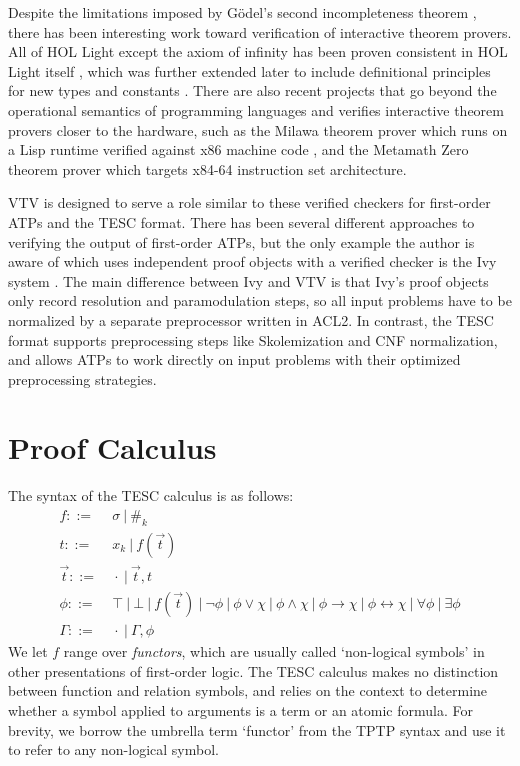 \documentclass{lipics-v2021}
\newcommand{\idf}[1]{\#_{#1}}
\begin{document}
Despite the limitations imposed by G\"odel's second incompleteness theorem \cite{godel1931formal},
there has been interesting work toward verification of interactive theorem provers. 
All of HOL Light except the axiom of infinity has been proven consistent in HOL Light itself \cite{harrison2006towards}, 
which was further extended later to include definitional principles for new types 
and constants \cite{kumar2014hol}. There are also recent projects that go 
beyond the operational semantics of programming languages and verifies interactive theorem provers 
closer to the hardware, such as the Milawa theorem prover which runs on a Lisp runtime
verified against x86 machine code \cite{davis2015reflective}, and the Metamath Zero 
\cite{carneiro2019metamath} theorem prover which targets x84-64 instruction set architecture. 

VTV is designed to serve a role similar to these verified checkers for 
first-order ATPs and the TESC format. There has been several different 
approaches \cite{sutcliffe2006semantic, chihani2015proof} to verifying 
the output of first-order ATPs, but the only example the author is aware of
which uses independent proof objects with a verified checker is the 
Ivy system \cite{mccune2000ivy}. The main difference between Ivy and 
VTV is that Ivy's proof objects only record resolution and paramodulation 
steps, so all input problems have to be normalized by a separate 
preprocessor written in ACL2. In contrast, the TESC format supports 
preprocessing steps like Skolemization and CNF normalization, and 
allows ATPs to work directly on input problems with their optimized 
preprocessing strategies.



\section{Proof Calculus} \label{sec:proof-calc} 

The syntax of the TESC calculus is as follows:
\begin{align*}
f ::= &\ \sigma\ |\ \idf{k}\\
t ::= &\ x_k\ |\ f(\vec{t})\\
\vec{t} ::= &\ \cdot\ |\ \vec{t}, t\\
\phi ::= &\ \top\ |\ \bot\ |\ f(\vec{t})\ |\ \lnot \phi\ |\ \phi \lor \chi\ |\ \phi \land \chi\ |\ \phi \to \chi\ |\ \phi \leftrightarrow \chi\ |\ \forall \phi\ |\ \exists \phi\\
\Gamma ::= &\ \cdot\ |\ \Gamma, \phi
\end{align*}
We let $f$ range over \textit{functors}, which are usually called `non-logical symbols' in
other presentations of first-order logic. The TESC calculus makes no distinction
between function and relation symbols, and relies on the context to determine whether 
a symbol applied to arguments is a term or an atomic formula. For brevity, we borrow
the umbrella term `functor' from the TPTP syntax and use it to refer to any non-logical symbol.
\end{document}
